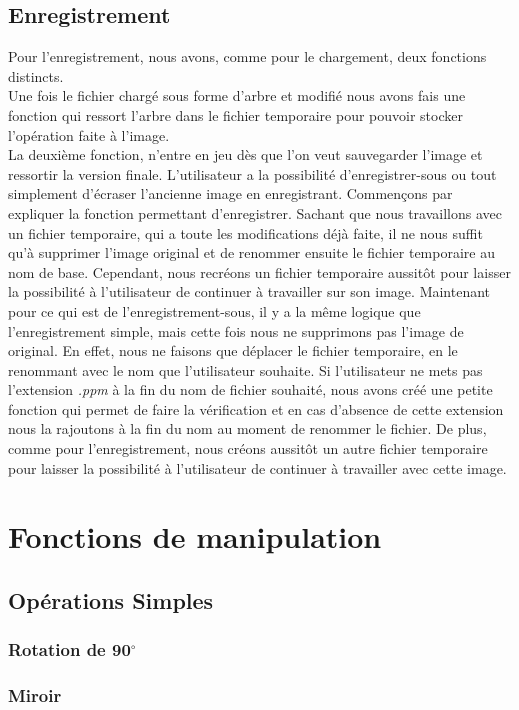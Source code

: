 \documentclass[12pt]{article}
\begin{document}
\subsection{Enregistrement}
Pour l'enregistrement, nous avons, comme pour le chargement, deux fonctions distincts. \\
Une fois le fichier chargé sous forme d'arbre et modifié nous avons fais une fonction qui ressort l'arbre dans le fichier temporaire pour pouvoir stocker l'opération faite à l'image.\\
La deuxième fonction, n'entre en jeu dès que l'on veut sauvegarder l'image et ressortir la version finale. L'utilisateur a la possibilité d'enregistrer-sous ou tout simplement d'écraser l'ancienne image en enregistrant. Commençons par expliquer la fonction permettant d'enregistrer. Sachant que nous travaillons avec un fichier temporaire, qui a toute les modifications déjà faite, il ne nous suffit qu'à supprimer l'image original et de renommer ensuite le fichier temporaire au nom de base. Cependant, nous recréons un fichier temporaire aussitôt pour laisser la possibilité à l'utilisateur de continuer à travailler sur son image. Maintenant pour ce qui est de l'enregistrement-sous, il y a la même logique que l'enregistrement simple, mais cette fois nous ne supprimons pas l'image de original. En effet, nous ne faisons que déplacer le fichier temporaire, en le renommant avec le nom que l'utilisateur souhaite. Si l'utilisateur ne mets pas l'extension \textit{.ppm} à la fin du nom de fichier souhaité, nous avons créé une petite fonction qui permet de faire la vérification et en cas d'absence de cette extension nous la rajoutons à la fin du nom au moment de renommer le fichier. De plus, comme pour l'enregistrement, nous créons aussitôt un autre fichier temporaire pour laisser la possibilité à l'utilisateur de continuer à travailler avec cette image.
\section{Fonctions de manipulation}
\subsection{Opérations Simples}
\subsubsection{Rotation de 90$^{\circ}$}
\subsubsection{Miroir}
\end{document}
